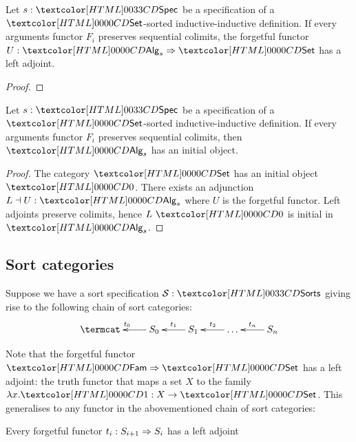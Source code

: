 \begin{proposition}
  Let $s : \specty$ be a specification of a $\Set$-sorted
  inductive-inductive definition. If every arguments functor $F_i$
  preserves sequential colimits, the forgetful functor
  $U : \Func{\Alg_s}{\Set}$ has a left adjoint.
\end{proposition}

\begin{proof}
  
\end{proof}

\begin{proposition}
  Let $s : \specty$ be a specification of a
  $\Set$-sorted inductive-inductive definition. If every arguments
  functor $F_i$ preserves sequential colimits, then
  $\Alg_s$ has an initial object.
\end{proposition}

\begin{proof}
  The category $\Set$ has an initial object $\initty$. There exists an
  adjunction $L \dashv U : \Alg_s$ where $U$ is the
  forgetful functor. Left adjoints preserve colimits, hence
  $L\ \initty$ is initial in $\Alg_s$.
\end{proof}

\subsection{Sort categories}

Suppose we have a sort specification $\Ss : \sortsty$ giving rise to
the following chain of sort categories:
$$
\xymatrix{
\termcat &S_0 \ar[l]_{t_0} &S_1 \ar[l]_{t_1} &\hdots \ar[l]_{t_2} &S_n \ar[l]_{t_n}
}
$$

Note that the forgetful functor $\Func{\Fam}{\Set}$ has a left
adjoint: the truth functor that maps a set $X$ to the family
$\lambda x . \unitty : X \to \Set$. This generalises to any functor in
the abovementioned chain of sort categories:

\begin{proposition}
Every forgetful functor $t_i : S_{i+1} \Rightarrow S_i$ has a left adjoint
\end{proposition}

